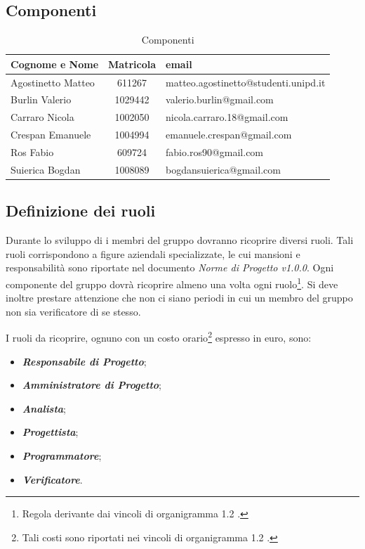 \subsection{Componenti}

\begin{table}[h]
	\centering
	\begin{tabular}{|l|c|l|}
		\toprule
		\textbf{Cognome e Nome} & \textbf{Matricola} & \textbf{email} \\
	
		\midrule
		Agostinetto Matteo & 611267 & matteo.agostinetto@studenti.unipd.it \\
		Burlin Valerio & 1029442 & valerio.burlin@gmail.com \\ 
		Carraro Nicola & 1002050 & nicola.carraro.18@gmail.com \\
		Crespan Emanuele & 1004994 & emanuele.crespan@gmail.com \\
		Ros Fabio & 609724 & fabio.ros90@gmail.com \\
		Suierica Bogdan & 1008089 & bogdansuierica@gmail.com \\
		
		\bottomrule
	\end{tabular}
	\caption{Componenti}
\end{table}

\subsection{Definizione dei ruoli}
Durante lo sviluppo di \PROGETTO{} i membri del gruppo dovranno ricoprire diversi ruoli. Tali ruoli corrispondono a figure aziendali specializzate, le cui mansioni e responsabilità sono riportate nel documento \textit{Norme di Progetto v1.0.0}. Ogni componente del gruppo dovrà ricoprire almeno una volta ogni ruolo\footnote{Regola derivante dai vincoli di organigramma 1.2 .}. Si deve inoltre prestare attenzione che non ci siano periodi in cui un membro del gruppo non sia verificatore di se stesso.

\noindent I ruoli da ricoprire, ognuno con un costo orario\footnote{Tali costi sono riportati nei vincoli di organigramma 1.2 .} espresso in euro, sono: 
\begin{itemize}
	\item \textbf{\textit{Responsabile di Progetto}};
	\item \textbf{\textit{Amministratore di Progetto}};
	\item \textbf{\textit{Analista}};
	\item \textbf{\textit{Progettista}};
	\item \textbf{\textit{Programmatore}};
	\item \textbf{\textit{Verificatore}}.	
\end{itemize}



